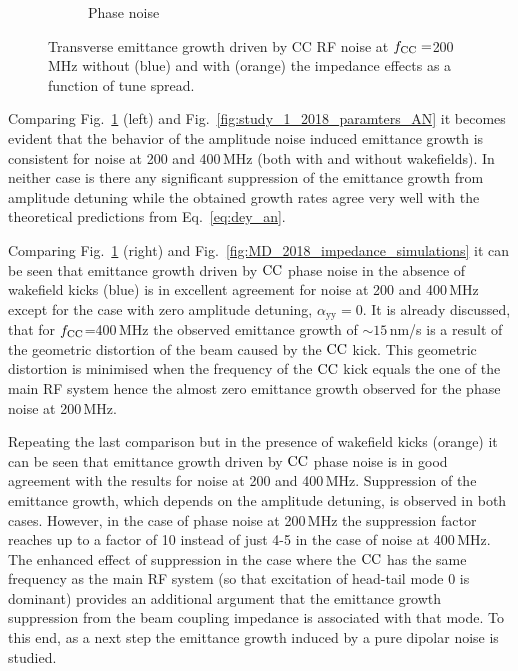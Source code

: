 \begin{figure}[!ht]
\begin{subfigure}[t]{0.45\textwidth}
        \caption{Phase noise}
    \end{subfigure}
    \hfill
     \caption{Transverse emittance growth driven by CC RF noise at ${f_\mathrm{CC}}=$200\,MHz without (blue) and with (orange) the impedance effects as a function of tune spread.} %
     \label{fig:CC_200MHz_amplitude_phase_noise}
 \end{figure}

 Comparing Fig.~\ref{fig:CC_200MHz_amplitude_phase_noise} (left) and Fig.~\ref{fig:study_1_2018_paramters_AN} it becomes evident that the behavior of the amplitude noise induced emittance growth is consistent for noise at 200 and 400\,MHz (both with and without wakefields). In neither case is there any significant suppression of the emittance growth from amplitude detuning while the obtained growth rates agree very well with the theoretical predictions from Eq.~\eqref{eq:dey_an}.
 
 Comparing Fig.~\ref{fig:CC_200MHz_amplitude_phase_noise} (right) and Fig.~\ref{fig:MD_2018_impedance_simulations} it can be seen that emittance growth driven by ${\mathrm{CC}}$ phase noise in the absence of wakefield kicks (blue) is in excellent agreement for noise at 200 and 400\,MHz except for the case with zero amplitude detuning, $\alpha_\mathrm{yy}=0$. It is already discussed, that for ${f_\mathrm{CC}}$=400\,MHz the observed emittance growth of $\sim 15$\,nm/s is a result of the geometric distortion of the beam caused by the ${\mathrm{CC}}$ kick. This geometric distortion is minimised when the frequency of the ${\mathrm{CC}}$ kick equals the one of the main RF system hence the almost zero emittance growth observed for the phase noise at 200\,MHz. 

 Repeating the last comparison but in the presence of wakefield kicks (orange) it can be seen that emittance growth driven by ${\mathrm{CC}}$ phase noise is in good agreement with the results for noise at 200 and 400\,MHz. Suppression of the emittance growth, which depends on the amplitude detuning, is observed in both cases. However, in the case of phase noise at 200\,MHz the suppression factor reaches up to a factor of 10 instead of just 4-5 in the case of noise at 400\,MHz. The enhanced effect of suppression in the case where the ${\mathrm{CC}}$ has the same frequency as the main RF system (so that excitation of head-tail mode 0 is dominant) provides an additional argument that the emittance growth suppression from the beam coupling impedance is associated with that mode. To this end, as a next step the emittance growth induced by a pure dipolar noise is studied.


